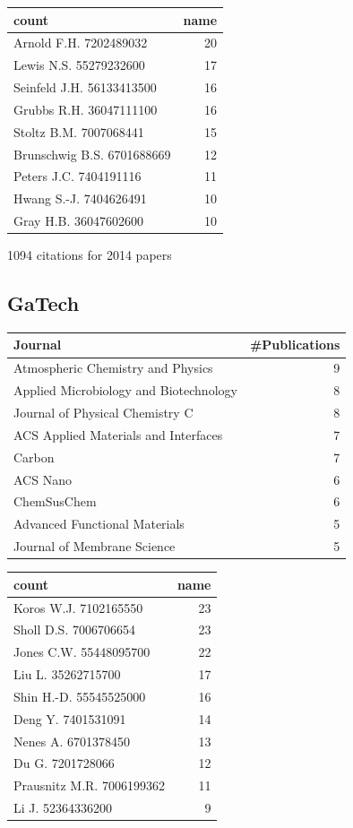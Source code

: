 \documentclass[11pt]{article}
\begin{document}
\begin{center}
\begin{tabular}{lr}
count & name\\
\hline
Arnold F.H. 7202489032 & 20\\
Lewis N.S. 55279232600 & 17\\
Seinfeld J.H. 56133413500 & 16\\
Grubbs R.H. 36047111100 & 16\\
Stoltz B.M. 7007068441 & 15\\
Brunschwig B.S. 6701688669 & 12\\
Peters J.C. 7404191116 & 11\\
Hwang S.-J. 7404626491 & 10\\
Gray H.B. 36047602600 & 10\\
\end{tabular}
\end{center}

1094 citations for 2014 papers

\subsection{GaTech}
\label{sec-1-3}
\begin{center}
\begin{tabular}{lr}
Journal & \#Publications\\
\hline
Atmospheric Chemistry and Physics & 9\\
Applied Microbiology and Biotechnology & 8\\
Journal of Physical Chemistry C & 8\\
ACS Applied Materials and Interfaces & 7\\
Carbon & 7\\
ACS Nano & 6\\
ChemSusChem & 6\\
Advanced Functional Materials & 5\\
Journal of Membrane Science & 5\\
\end{tabular}
\end{center}

\begin{center}
\begin{tabular}{lr}
count & name\\
\hline
Koros W.J. 7102165550 & 23\\
Sholl D.S. 7006706654 & 23\\
Jones C.W. 55448095700 & 22\\
Liu L. 35262715700 & 17\\
Shin H.-D. 55545525000 & 16\\
Deng Y. 7401531091 & 14\\
Nenes A. 6701378450 & 13\\
Du G. 7201728066 & 12\\
Prausnitz M.R. 7006199362 & 11\\
Li J. 52364336200 & 9\\
\end{tabular}
\end{center}
\end{document}
